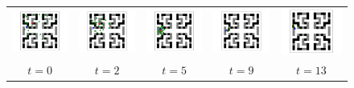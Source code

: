 \documentclass[letterpaper]{article} %
\begin{document}
\begin{figure}[t]
	\centering
	\begin{tabular}{ccccc}
		\includegraphics[width=0.18\linewidth]{figs/95/0.pdf} &
		\includegraphics[width=0.18\linewidth]{figs/95/2.pdf} &
		\includegraphics[width=0.18\linewidth]{figs/95/5.pdf} &
		\includegraphics[width=0.18\linewidth]{figs/95/9.pdf} &
		\includegraphics[width=0.18\linewidth]{figs/95/13.pdf} \\
		$t=0$ & $t=2$ & $t=5$ & $t=9$ & $t=13$
	\end{tabular}
\end{figure}
\end{document}
